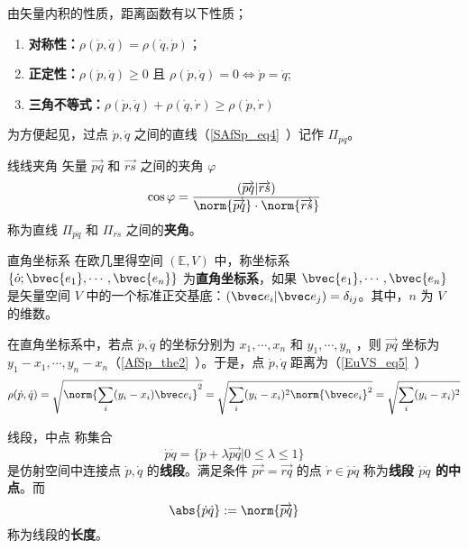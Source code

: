 由矢量内积的性质，距离函数有以下性质；
\begin{enumerate}
\item \textbf{对称性：}$\rho(\dot p,\dot q)=\rho(\dot q,\dot p)$；
\item \textbf{正定性：}$\rho(\dot p,\dot q)\geq 0$ 且 $\rho(\dot p,\dot q)= 0\Leftrightarrow\dot p=\dot q$;
\item \textbf{三角不等式：}$\rho(\dot p,\dot q)+\rho(\dot q,\dot r)\geq\rho(\dot p,\dot r)$
\end{enumerate}
为方便起见，过点 $\dot p,\dot q$ 之间的直线（\autoref{SAfSp_eq4}~）记作 $\Pi_{\dot p\dot q}$。
\begin{definition}{线线夹角}
矢量 $\overrightarrow{pq}$ 和 $\overrightarrow{rs}$ 之间的夹角 $\varphi$
\begin{equation}
\cos\varphi=\frac{(\overrightarrow{pq}|\overrightarrow{rs})}{\norm{\overrightarrow{pq}}\cdot\norm{\overrightarrow{rs}}}
\end{equation}
称为直线 $\Pi_{\dot p\dot q}$ 和 $\Pi_{\dot r\dot s}$ 之间的\textbf{夹角}。
\end{definition}
\begin{definition}{直角坐标系}
在欧几里得空间 $(\mathbb E,V)$ 中，称坐标系 $\{\dot o;\bvec{e_1},\cdots,\bvec{e_n}\}$ 为\textbf{直角坐标系}，如果 $\bvec{e_1},\cdots,\bvec{e_n}$ 是矢量空间 $V$ 中的一个标准正交基底：$(\bvec e_i|\bvec e_j)=\delta_{ij}$。其中，$n$ 为 $V$ 的维数。
\end{definition}
\begin{example}{}
在直角坐标系中，若点 $\dot p,\dot q$ 的坐标分别为 $x_1,\cdots,x_n$ 和 $y_1,\cdots,y_n$ ，则 $\overrightarrow{pq}$ 坐标为 $y_1-x_1,\cdots,y_n-x_n$（\autoref{AfSp_the2}~）。于是，点 $\dot p,\dot q$ 距离为（\autoref{EuVS_eq5}~）
\begin{equation}
\rho(\dot p,\dot q)=\sqrt{\norm{\sum_{i}(y_i-x_i)\bvec e_i}^2}=\sqrt{\sum_{i}(y_i-x_i)^2\norm{\bvec e_i}^2}=\sqrt{\sum_{i}(y_i-x_i)^2}
\end{equation}
\end{example}
\begin{definition}{线段，中点}
称集合
\begin{equation}
\dot p\dot q=\{\dot p+\lambda\overrightarrow{pq}|0\leq\lambda\leq1\}
\end{equation}
是仿射空间中连接点 $\dot p,\dot q$ 的\textbf{线段}。满足条件 $\overrightarrow{pr}=\overrightarrow{rq}$ 的点 $\dot r\in\dot p\dot q$ 称为\textbf{线段 $\dot p\dot q$ 的中点}。而
\begin{equation}
\abs{\dot p\dot q}:=\norm{\overrightarrow{pq}}
\end{equation}
称为线段的\textbf{长度}。
\end{definition}
